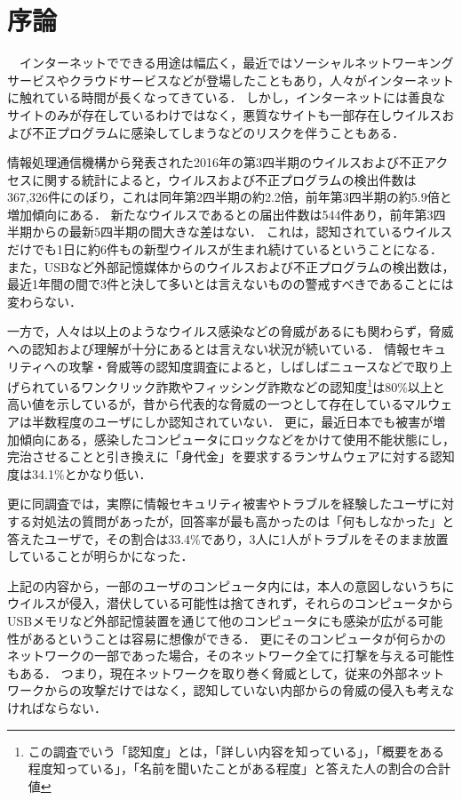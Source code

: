 \chapter{序論}

　インターネットでできる用途は幅広く，最近ではソーシャルネットワーキングサービスやクラウドサービスなどが登場したこともあり，人々がインターネットに触れている時間が長くなってきている．
しかし，インターネットには善良なサイトのみが存在しているわけではなく，悪質なサイトも一部存在しウイルスおよび不正プログラムに感染してしまうなどのリスクを伴うこともある．

情報処理通信機構から発表された2016年の第3四半期のウイルスおよび不正アクセスに関する統計によると，ウイルスおよび不正プログラムの検出件数は367,326件にのぼり，これは同年第2四半期の約2.2倍，前年第3四半期の約5.9倍と増加傾向にある\cite{joron2}．
新たなウイルスであるとの届出件数は544件あり，前年第3四半期からの最新5四半期の間大きな差はない．
これは，認知されているウイルスだけでも1日に約6件もの新型ウイルスが生まれ続けているということになる．
また，USBなど外部記憶媒体からのウイルスおよび不正プログラムの検出数は，最近1年間の間で3件と決して多いとは言えないものの警戒すべきであることには変わらない．

一方で，人々は以上のようなウイルス感染などの脅威があるにも関わらず，脅威への認知および理解が十分にあるとは言えない状況が続いている．
情報セキュリティへの攻撃・脅威等の認知度調査\cite{joron1}によると，しばしばニュースなどで取り上げられているワンクリック詐欺やフィッシング詐欺などの認知度\footnote{この調査でいう「認知度」とは，「詳しい内容を知っている」，「概要をある程度知っている」，「名前を聞いたことがある程度」と答えた人の割合の合計値}は80\%以上と高い値を示しているが，昔から代表的な脅威の一つとして存在しているマルウェアは半数程度のユーザにしか認知されていない．
更に，最近日本でも被害が増加傾向にある，感染したコンピュータにロックなどをかけて使用不能状態にし，完治させることと引き換えに「身代金」を要求するランサムウェア\cite{ransomware}に対する認知度は34.1\%とかなり低い．

更に同調査では，実際に情報セキュリティ被害やトラブルを経験したユーザに対する対処法の質問があったが，回答率が最も高かったのは「何もしなかった」と答えたユーザで，その割合は33.4\%であり，3人に1人がトラブルをそのまま放置していることが明らかになった\cite{joron1}．

上記の内容から，一部のユーザのコンピュータ内には，本人の意図しないうちにウイルスが侵入，潜伏している可能性は捨てきれず，それらのコンピュータからUSBメモリなど外部記憶装置を通じて他のコンピュータにも感染が広がる可能性があるということは容易に想像ができる．
更にそのコンピュータが何らかのネットワークの一部であった場合，そのネットワーク全てに打撃を与える可能性もある．
つまり，現在ネットワークを取り巻く脅威として，従来の外部ネットワークからの攻撃だけではなく，認知していない内部からの脅威の侵入も考えなければならない．

